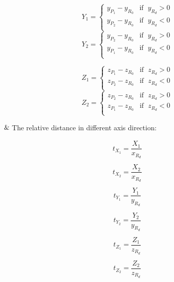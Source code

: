 \begin{multicols}{2}
\noindent
	\[
	Y_1 =
	\begin{cases}
	y_{P_1} - y_{R_0} & \text{if }\;y_{R_d} > 0\\
	y_{P_2} - y_{R_0} & \text{if }\;y_{R_d} < 0\\
	\end{cases}
	\]
\columnbreak
	\[
	Y_2 =
	\begin{cases}
	y_{P_2} - y_{R_0} & \text{if }\;y_{R_d} > 0\\
	y_{P_1} - y_{R_0} & \text{if }\;y_{R_d} < 0\\
	\end{cases}
	\]
\end{multicols}

\begin{multicols}{2}
\noindent
	\[
	Z_1 =
	\begin{cases}
	z_{P_1} - z_{R_0} & \text{if }\;z_{R_d} > 0\\
	z_{P_2} - z_{R_0} & \text{if }\;z_{R_d} < 0\\
	\end{cases}
	\]
\columnbreak
	\[
	Z_2 =
	\begin{cases}
	z_{P_2} - z_{R_0} & \text{if }\;z_{R_d} > 0\\
	z_{P_1} - z_{R_0} & \text{if }\;z_{R_d} < 0\\
	\end{cases}
	\]
\end{multicols}

$\And$\;\;\;\;The relative distance in different axis direction:

\begin{multicols}{3}
\noindent
	\[
	\begin{array}{lr}
	t_{X_1} = \dfrac{X_1}{x_{R_d}}\\\\
	t_{X_2} = \dfrac{X_2}{x_{R_d}}\\
	\end{array}
	\]
\columnbreak
	\[
	\begin{array}{lr}
	t_{Y_1} = \dfrac{Y_1}{y_{R_d}}\\\\
	t_{Y_2} = \dfrac{Y_2}{y_{R_d}}\\
	\end{array}
	\]
\columnbreak
	\[
	\begin{array}{lr}
	t_{Z_1} = \dfrac{Z_1}{z_{R_d}}\\\\
	t_{Z_2} = \dfrac{Z_2}{z_{R_d}}\\
	\end{array}
	\]
\end{multicols}

